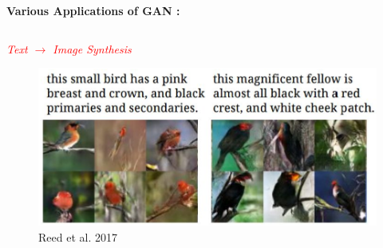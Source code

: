 \begin{frame}
\textbf{Various Applications of GAN :}
	\vspace*{2mm}
	\begin{columns}

			\begin{overlayarea}{\textwidth}{\textheight}
			\hspace*{6mm}
			\textcolor{red}{\textit{Text $\rightarrow$ Image Synthesis}}
				\begin{center}
				\begin{figure}[h!]

					\includegraphics[scale=0.15]{images/image-synthesis.png}
					\vspace*{-4mm}
					\caption{Reed et al. 2017}
				\end{figure}
				\end{center}
			\end{overlayarea}
			

\end{columns}
\end{frame}
